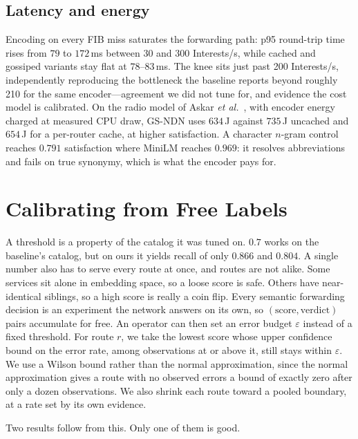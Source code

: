 \documentclass[conference]{IEEEtran}
\begin{document}
		\subsection{Latency and energy}
		\label{sec:scaling-latency}
		
		Encoding on every FIB miss saturates the forwarding path: p95 round-trip time
		rises from $79$ to $172$\,ms between 30 and 300 Interests/s, while cached and
		gossiped variants stay flat at $78$--$83$\,ms. The knee sits just past 200
		Interests/s, independently reproducing the bottleneck the baseline reports
		beyond roughly 210 for the same encoder---agreement we did not tune for, and
		evidence the cost model is calibrated. On the radio model of Askar \emph{et
			al.}~\cite{askar2024sef}, with encoder energy charged at measured CPU draw,
		GS-NDN uses $634$\,J against $735$\,J uncached and $654$\,J for a per-router
		cache, at higher satisfaction. A character $n$-gram control reaches $0.791$
		satisfaction where MiniLM reaches $0.969$: it resolves abbreviations and fails
		on true synonymy, which is what the encoder pays for.
		
		\section{Calibrating from Free Labels}
		\label{sec:risk}
		
		A threshold is a property of the catalog it was tuned on. $0.7$ works on the
		baseline's catalog, but on ours it yields recall of only $0.866$ and
		$0.804$. A single number also has to serve every route at once, and routes
		are not alike. Some services sit alone in embedding space, so a loose score
		is safe. Others have near-identical siblings, so a high score is really a
		coin flip. Every semantic forwarding decision is an experiment the network
		answers on its own, so $(\text{score},\text{verdict})$ pairs accumulate for
		free. An operator can then set an error budget $\varepsilon$ instead of a
		fixed threshold. For route $r$, we take the lowest score whose upper
		confidence bound on the error rate, among observations at or above it,
		still stays within $\varepsilon$. We use a Wilson bound rather than the
		normal approximation, since the normal approximation gives a route with no
		observed errors a bound of exactly zero after only a dozen observations. We
		also shrink each route toward a pooled boundary, at a rate set by its own
		evidence.
		
		Two results follow from this. Only one of them is good.
		
\end{document}
